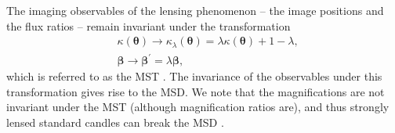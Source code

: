 \documentclass[longauth]{aa}
\newcommand{\bbeta}{\bm{\beta}}
\newcommand{\btheta}{\bm{\theta}}
\newcommand{\ajs}[1]{{{#1}}}
\begin{document}
The imaging observables of the lensing phenomenon -- the image positions and the flux ratios -- remain invariant under the transformation
%
\begin{equation}
        \begin{split}
        &\kappa(\btheta) \to \kappa_{\lambda} (\btheta) = \lambda \kappa (\btheta) + 1 - \lambda, \\
        &\bbeta \to \bbeta^\prime = \lambda \bbeta,
        \end{split}
\end{equation}
%
which is referred \ajs{to} as the MST \citep[][]{Falco85}. The invariance of the observables under this transformation gives rise to the MSD. We note that the magnifications are not invariant under the MST (although magnification ratios are), and thus strongly lensed standard candles can break the MSD \citep{Bertin06}.
\end{document}
